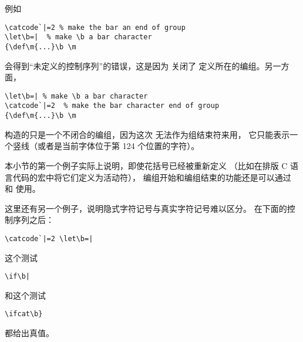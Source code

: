 \documentclass{book}
\begin{document}
例如
\begin{verbatim}
\catcode`|=2 % make the bar an end of group
\let\b=|  % make \b a bar character
{\def\m{...}\b \m
\end{verbatim}
会得到“未定义的控制序列”的错误，这是因为  关闭了 
定义所在的编组。另一方面，
\begin{verbatim}
\let\b=| % make \b a bar character
\catcode`|=2  % make the bar character end of group
{\def\m{...}\b \m
\end{verbatim}
构造的只是一个不闭合的编组，因为这次  无法作为组结束符来用，
它只能表示一个竖线（或者是当前字体位于第 124 个位置的字符）。

本小节的第一个例子实际上说明，即使花括号已经被重新定义%
（比如在排版 C 语言代码的宏中将它们定义为活动符），
编组开始和编组结束的功能还是可以通过  和  使用。

这里还有另一个例子，说明隐式字符记号与真实字符记号难以区分。
在下面的控制序列之后：
\begin{verbatim}
\catcode`|=2 \let\b=|
\end{verbatim}
这个测试
\begin{verbatim}
\if\b|
\end{verbatim}
和这个测试
\begin{verbatim}
\ifcat\b}
\end{verbatim}
都给出真值。
\end{document}
